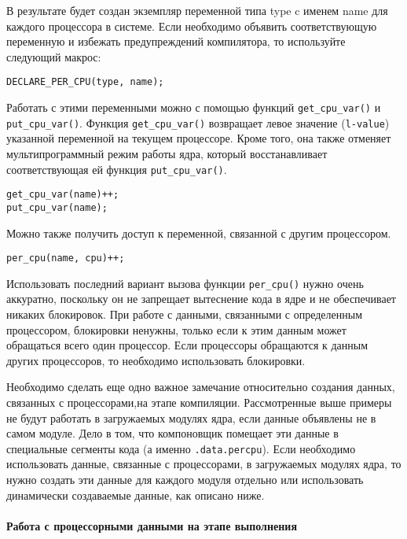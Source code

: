 \documentclass[12pt]{article}
\begin{document}
В результате будет создан экземпляр переменной типа type c именем name для каждого процессора в системе. Если необходимо объявить соответствующую переменную и
избежать предупреждений компилятора, то используйте следующий макрос:

\begin{lstlisting}
DECLARE_PER_CPU(type, name);
\end{lstlisting}

Работать с этими переменными можно с помощью функций \verb!get_cpu_var()! и \verb!put_cpu_var()!.
Функция \verb!get_cpu_var()! возвращает левое значение (\verb!l-value!) указанной
переменной на текущем процессоре. Кроме того, она также отменяет мультипрограммный режим работы ядра,
который восстанавливает соответствующая ей функция \verb!put_cpu_var()!.

\begin{lstlisting}
get_cpu_var(name)++;
put_cpu_var(name);
\end{lstlisting}

Можно также получить доступ к переменной, связанной с другим процессором.

\begin{lstlisting}
per_cpu(name, cpu)++;
\end{lstlisting}

Использовать последний вариант вызова функции \verb!per_cpu()! нужно очень аккуратно, поскольку он не запрещает вытеснение кода в ядре и не обеспечивает никаких блокировок.
При работе с данными, связанными с определенным процессором, блокировки ненужны, только если к этим данным может обращаться всего один процессор.
Если процессоры обращаются к данным других процессоров, то необходимо использовать блокировки.

Необходимо сделать еще одно важное замечание относительно создания данных, связанных с процессорами,на этапе компиляции.
Рассмотренные выше примеры не будут работать в загружаемых модулях ядра, если данные объявлены не в самом модуле.
Дело в том, что компоновщик помещает эти данные в специальные сегменты кода (а именно
\verb!.data.percpu!). Если необходимо использовать данные, связанные с процессорами,
в загружаемых модулях ядра, то нужно создать эти данные для каждого модуля отдельно
или использовать динамически создаваемые данные, как описано ниже.

\paragraph*{Работа с процессорными данными на этапе выполнения}
~\\
\end{document}
